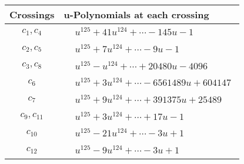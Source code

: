 \documentclass[1p]{elsarticle_modified}
\theoremstyle{definition}
\begin{document}
\begin{tabular}{m{50pt}|m{274pt}}
Crossings & \hspace{64pt}u-Polynomials at each crossing \\
\hline $$\begin{aligned}c_{1},c_{4}\end{aligned}$$&$\begin{aligned}
&u^{125}+41 u^{124}+\cdots-145 u-1
\end{aligned}$\\
\hline $$\begin{aligned}c_{2},c_{5}\end{aligned}$$&$\begin{aligned}
&u^{125}+7 u^{124}+\cdots-9 u-1
\end{aligned}$\\
\hline $$\begin{aligned}c_{3},c_{8}\end{aligned}$$&$\begin{aligned}
&u^{125}- u^{124}+\cdots+20480 u-4096
\end{aligned}$\\
\hline $$\begin{aligned}c_{6}\end{aligned}$$&$\begin{aligned}
&u^{125}+3 u^{124}+\cdots-6561489 u+604147
\end{aligned}$\\
\hline $$\begin{aligned}c_{7}\end{aligned}$$&$\begin{aligned}
&u^{125}+9 u^{124}+\cdots+391375 u+25489
\end{aligned}$\\
\hline $$\begin{aligned}c_{9},c_{11}\end{aligned}$$&$\begin{aligned}
&u^{125}+3 u^{124}+\cdots+17 u-1
\end{aligned}$\\
\hline $$\begin{aligned}c_{10}\end{aligned}$$&$\begin{aligned}
&u^{125}-21 u^{124}+\cdots-3 u+1
\end{aligned}$\\
\hline $$\begin{aligned}c_{12}\end{aligned}$$&$\begin{aligned}
&u^{125}-9 u^{124}+\cdots-3 u+1
\end{aligned}$\\
\hline
\end{tabular}\\~\\
\end{document}
